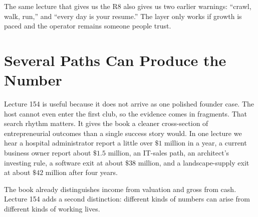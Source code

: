 \documentclass[11pt,oneside]{book}
\begin{document}
\begin{remark}
The same lecture that gives us the R8 also gives us two earlier warnings: ``crawl, walk, run,'' and ``every day is your resume.'' The layer only works if growth is paced and the operator remains someone people trust.
\end{remark}


\section{Several Paths Can Produce the Number}

Lecture 154 is useful because it does not arrive as one polished founder case. The host cannot even enter the first club, so the evidence comes in fragments. That search rhythm matters. It gives the book a cleaner cross-section of entrepreneurial outcomes than a single success story would. In one lecture we hear a hospital administrator report a little over \(\$1\) million in a year, a current business owner report about \(\$1.5\) million, an IT-sales path, an architect's investing rule, a software exit at about \(\$38\) million, and a landscape-supply exit at about \(\$42\) million after four years.

The book already distinguishes income from valuation and gross from cash. Lecture 154 adds a second distinction: different kinds of numbers can arise from different kinds of working lives.
\end{document}
